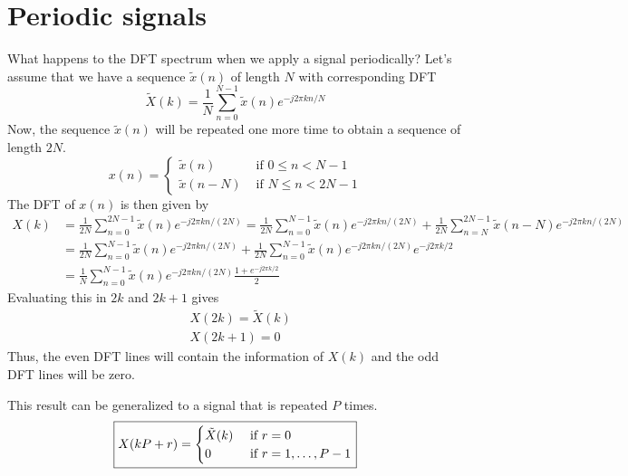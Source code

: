 \section{Periodic signals}
What happens to the DFT spectrum when we apply a signal periodically? Let's assume that we have a sequence $\tilde{x}(n)$ of length $N$ with corresponding DFT
\begin{equation*}
    \tilde{X}(k) = \frac{1}{N}\sum_{n=0}^{N-1} \tilde{x}(n) e^{-j 2\pi k n/N}
\end{equation*}
Now, the sequence $\tilde{x}(n)$ will be repeated one more time to obtain a sequence of length $2N$.
\begin{equation*}
    x(n) = \begin{cases}
        \tilde{x}(n) &\text{ if } 0 \leq n < N - 1\\
        \tilde{x}(n-N) &\text{ if } N \leq n < 2N - 1
    \end{cases}
\end{equation*}
The DFT of $x(n)$ is then given by
\begin{align*}
    X(k) &= \frac{1}{2N}\sum_{n=0}^{2 N-1} \tilde{x}(n) e^{-j 2\pi k n/(2N)} = \frac{1}{2N}\sum_{n=0}^{N-1} \tilde{x}(n) e^{-j 2\pi k n/(2N)} + \frac{1}{2N}\sum_{n=N}^{2N-1} \tilde{x}(n-N) e^{-j 2\pi k n/(2N)} \\
    &= \frac{1}{2N}\sum_{n=0}^{N-1} \tilde{x}(n) e^{-j 2\pi k n/(2N)} + \frac{1}{2N}\sum_{n=0}^{N-1} \tilde{x}(n) e^{-j 2\pi k n/(2N)}  e^{-j 2\pi k/2} \\
    &= \frac{1}{N}\sum_{n=0}^{N-1} \tilde{x}(n) e^{-j 2\pi k n/(2N)} \frac{1+e^{-j 2\pi k/2}}{2}
    \end{align*}
Evaluating this in $2k$ and $2k+1$ gives
\begin{align*}
    &X(2k) = \tilde{X}(k)\\
    &X(2k+1) = 0
\end{align*}
Thus, the even DFT lines will contain the information of $X(k)$ and the odd DFT lines will be zero.

This result can be generalized to a signal that is repeated $P$ times.
\begin{equation*}
\boxed{
    X(kP+r) =
    \begin{cases}
        \tilde{X}(k) &\text{ if } r = 0\\
        0 & \text{ if } r = 1,\ldots,P-1\\
    \end{cases}
}
\end{equation*}

